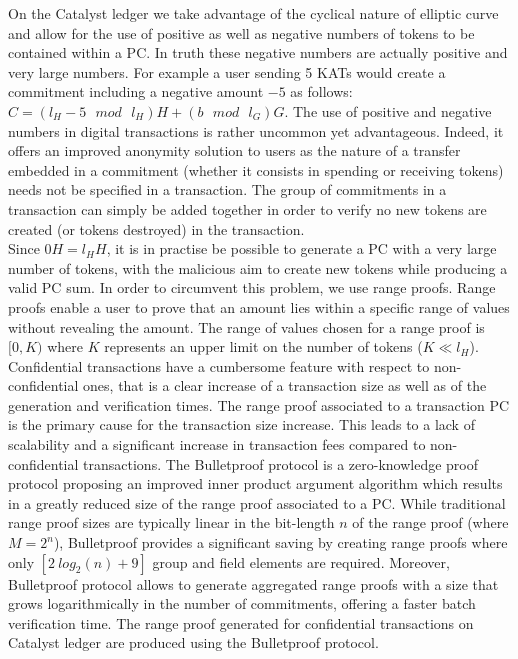 On the Catalyst ledger we take advantage of the cyclical nature of elliptic curve and allow for the use of positive as well as negative numbers of tokens to be contained within a PC. In truth these negative numbers are actually positive and very large numbers. For example a user sending 5 KATs would create a commitment including a negative amount $-5$ as follows: $C = (l_H - 5 \text{ $mod$ } l_H) H + (b \text{ $mod$ } l_G) G$. The use of positive and negative numbers in digital transactions is rather uncommon yet advantageous. Indeed, it offers an improved anonymity solution to users as the nature of a transfer embedded in a commitment (whether it consists in spending or receiving tokens) needs not be specified in a transaction. The group of commitments in a transaction can simply be added together in order to verify no new tokens are created (or tokens destroyed) in the transaction. \\

Since $0H=l_HH$, it is in practise be possible to generate a PC with a very large number of tokens, with the malicious aim to create new tokens while producing a valid PC sum. In order to circumvent this problem, we use range proofs. Range proofs enable a user to prove that an amount lies within a specific range of values without revealing the amount. The range of values chosen for a range proof is $[0,K)$ where $K$ represents an upper limit on the number of tokens ($K \ll l_H$).\\

Confidential transactions have a cumbersome feature with respect to non-confidential ones, that is a clear increase of a transaction size as well as of the generation and verification times. The range proof associated to a transaction PC is the primary cause for the transaction size increase. This leads to a lack of scalability and a significant increase in transaction fees compared to non-confidential transactions. The Bulletproof protocol is a zero-knowledge proof protocol \cite{bulletproof} proposing an improved inner product argument algorithm which results in a greatly reduced size of the range proof associated to a PC. While traditional range proof sizes are typically linear in the bit-length $n$ of the range proof (where $M = 2^n$), Bulletproof provides a significant saving by creating range proofs where only $[2~log_2(n) + 9]$ group and field elements are required. Moreover, Bulletproof protocol allows to generate aggregated range proofs with a size that grows logarithmically in the number of commitments, offering a faster batch verification time. The range proof generated for confidential transactions on Catalyst ledger are produced using the Bulletproof protocol. 
